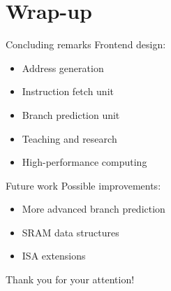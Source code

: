 \documentclass{beamer}
\begin{document}
\section{Wrap-up}

\begin{frame}{Concluding remarks}
  Frontend design:
  \begin{itemize}[<+->]
    \item Address generation
    \item Instruction fetch unit
    \item Branch prediction unit
  \end{itemize}

  \begin{itemize}[<+->]
    \item Teaching and research
    \item High-performance computing
  \end{itemize}
\end{frame}

\begin{frame}{Future work}
  Possible improvements:
  \begin{itemize}[<+->]
    \item More advanced branch prediction
    \item SRAM data structures
    \item ISA extensions
  \end{itemize}
\end{frame}

\begin{frame}[standout]
  Thank you for your attention!
\end{frame}
\end{document}
